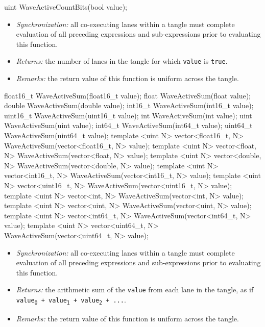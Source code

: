 \begin{HLSL}
uint WaveActiveCountBits(bool value);
\end{HLSL}

\begin{itemize}
  \item \textit{Synchronization:} all co-executing \gls{lane}s within a \gls{tangle}
  must complete evaluation of all preceding expressions and sub-expressions
  prior to evaluating this function.
  \item \textit{Returns:} the number of \gls{lane}s in the \gls{tangle} for which
  \texttt{value} is \texttt{true}.
  \item \textit{Remarks:} the return value of this function is uniform across
  the \gls{tangle}.
\end{itemize}

\begin{HLSL}
float16_t WaveActiveSum(float16_t value);
float WaveActiveSum(float value);
double WaveActiveSum(double value);
int16_t WaveActiveSum(int16_t value);
uint16_t WaveActiveSum(uint16_t value);
int WaveActiveSum(int value);
uint WaveActiveSum(uint value);
int64_t WaveActiveSum(int64_t value);
uint64_t WaveActiveSum(uint64_t value);
template <uint N> vector<float16_t, N> WaveActiveSum(vector<float16_t, N> value);
template <uint N> vector<float, N> WaveActiveSum(vector<float, N> value);
template <uint N> vector<double, N> WaveActiveSum(vector<double, N> value);
template <uint N> vector<int16_t, N> WaveActiveSum(vector<int16_t, N> value);
template <uint N> vector<uint16_t, N> WaveActiveSum(vector<uint16_t, N> value);
template <uint N> vector<int, N> WaveActiveSum(vector<int, N> value);
template <uint N> vector<uint, N> WaveActiveSum(vector<uint, N> value);
template <uint N> vector<int64_t, N> WaveActiveSum(vector<int64_t, N> value);
template <uint N> vector<uint64_t, N> WaveActiveSum(vector<uint64_t, N> value);
\end{HLSL}

\begin{itemize}
  \item \textit{Synchronization:} all co-executing \gls{lane}s within a \gls{tangle}
  must complete evaluation of all preceding expressions and sub-expressions
  prior to evaluating this function.
  \item \textit{Returns:} the arithmetic sum of the \texttt{value} from each
  \gls{lane} in the \gls{tangle}, as if \texttt{value\textsubscript{0} +
  value\textsubscript{1} + value\textsubscript{2} + ...}.
  \item \textit{Remarks:} the return value of this function is uniform across
  the \gls{tangle}.
\end{itemize}

